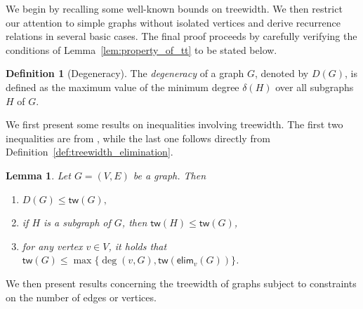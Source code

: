 \documentclass[sn-mathphys, natbib=false]{sn-jnl}
\theoremstyle{plain}
\newtheorem{lemma}{Lemma}
\theoremstyle{definition}
\newtheorem{definition}{Definition}
\newcommand{\degp}[2]{\deg(#1,#2)}
\newcommand{\treewidthp}[1]{\mathsf{tw}(#1)}
\newcommand{\degeneracy}{D}
\newcommand{\degeneracyg}[1]{\degeneracy(#1)}
\newcommand{\eliminatevg}[2]{\mathsf{elim}_{#1}(#2)}
\begin{document}
\begin{bibunit}[agsm]
We begin by recalling some well-known bounds on treewidth. We then restrict our attention to simple graphs without isolated vertices and derive recurrence relations in several basic cases. The final proof proceeds by carefully verifying the conditions of Lemma~\ref{lem:property_of_tt} to be stated below.

\begin{definition}[Degeneracy]
\label{def:degeracy}
The \emph{degeneracy} of a graph $G$, denoted by $\degeneracyg{G}$, is defined as the maximum value of the minimum degree $\delta(H)$ over all subgraphs $H$ of $G$.
\end{definition}

We first present some results on inequalities involving treewidth. The first two inequalities are from \citet{bodlaender2011treewidth}, while the last one follows directly from Definition~\ref{def:treewidth_elimination}.

\begin{lemma}
\label{lem:simple_bounds_on_treewidth}
Let $G = (V, E)$ be a graph. Then
\begin{enumerate}
    \item $ \degeneracyg{G} \leq \treewidthp{G},$
    
    \item if $H$ is a subgraph of $G$, then $\treewidthp{H} \leq \treewidthp{G}$, 
    
    \item for any vertex $v \in V$, it holds that $\treewidthp{G} \leq \max \{\degp{v}{G}, \treewidthp{\eliminatevg{v}{G}} \}$.
\end{enumerate}
\end{lemma}

We then present results concerning the treewidth of graphs subject to constraints on the number of edges or vertices.


\end{bibunit}
\end{document}
